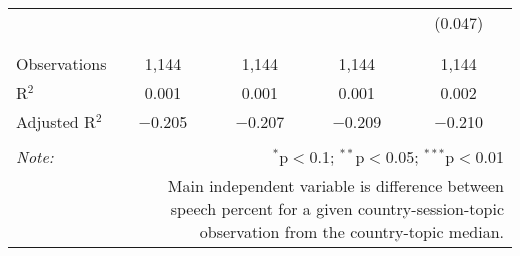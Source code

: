 \begin{table}[!htbp]
\begin{tabular}{@{\extracolsep{5pt}}lcccc}
  &  &  &  & (0.047) \\ 
  & & & & \\ 
\hline \\[-1.8ex] 
Observations & 1,144 & 1,144 & 1,144 & 1,144 \\ 
R$^{2}$ & 0.001 & 0.001 & 0.001 & 0.002 \\ 
Adjusted R$^{2}$ & $-$0.205 & $-$0.207 & $-$0.209 & $-$0.210 \\ 
\hline 
\hline \\[-1.8ex] 
\textit{Note:}  & \multicolumn{4}{r}{$^{*}$p$<$0.1; $^{**}$p$<$0.05; $^{***}$p$<$0.01} \\ 
 & \multicolumn{4}{r}{Main independent variable is difference between speech percent for a given country-session-topic observation from the country-topic median.} \\ 
\end{tabular} 
\end{table} 
